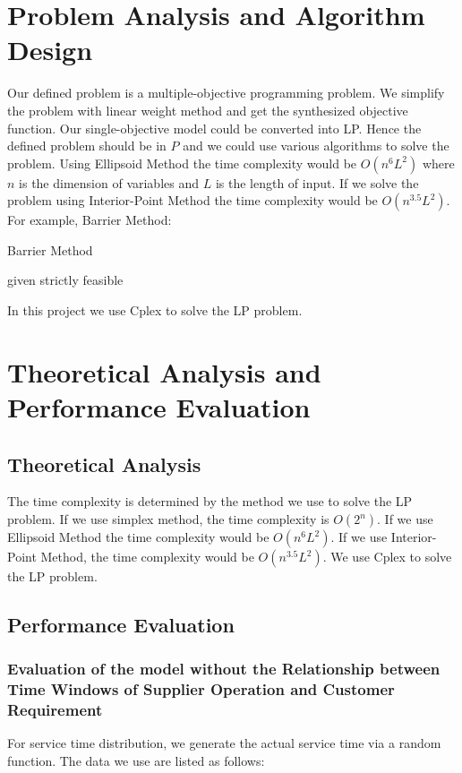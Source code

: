 \documentclass[12pt,a4paper]{article}
\begin{document}
\section{Problem Analysis and Algorithm Design}
Our defined problem is a multiple-objective programming problem. We simplify the problem with linear weight method and get the synthesized objective function. Our single-objective model could be converted into LP. Hence the defined problem should be in $P$ and we could use various algorithms to solve the problem. Using Ellipsoid Method the time complexity would be $O(n^6L^2)$ where $n$ is the dimension of variables and $L$ is the length of input. If we solve the problem using Interior-Point Method the time complexity would be $O(n^{3.5}L^2)$.\\
For example, Barrier Method\cite{Convex}:\\
\begin{algorithm}[H]
\caption{Barrier Method}
 given strictly feasible\\
\end{algorithm}
In this project we use Cplex to solve the LP problem.
\newpage

\section{Theoretical Analysis and Performance Evaluation}
\subsection{Theoretical Analysis}
The time complexity is determined by the method we use to solve the LP problem. If we use simplex method, the time complexity is $O(2^n)$. If we use Ellipsoid Method the time complexity would be $O(n^6L^2)$. If we use Interior-Point Method, the time complexity would be $O(n^{3.5}L^2)$. We use Cplex to solve the LP problem.
\subsection{Performance Evaluation}
\subsubsection{Evaluation of the model without the Relationship between Time Windows of Supplier Operation and Customer Requirement}
For service time distribution, we generate the actual service time via a random function. The data we use are listed as follows:\\
\end{document}
